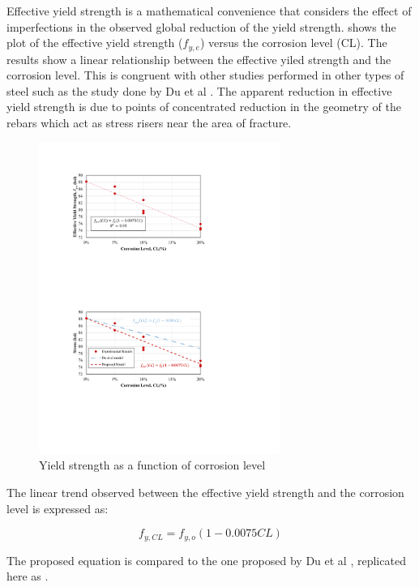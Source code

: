 Effective yield strength is a mathematical convenience that considers the effect of imperfections in the observed global reduction of the yield strength.  shows the plot of the effective yield strength ($f_{y,e}$) versus the corrosion level (CL). The results show a linear relationship between the effective yiled strength and the corrosion level. This is congruent with other studies performed in other types of steel such as the study done by Du et al \cite{Du2005}. The apparent reduction in effective yield strength is due to points of concentrated reduction in the geometry of the rebars which act as stress risers near the area of fracture. 
\begin{figure}[htbp]
	\centering
	\includegraphics[width=0.7\textwidth]{VAC Thesis 2.0/Chapter-4/figs/TensionTest_results_2.pdf}
	\caption{Yield strength as a function of corrosion level}
	\label{fig:YieldStrength_vs_CL}
\end{figure}

The linear trend observed between the effective yield strength and the corrosion level is expressed as:

\begin{equation}
    f_{y,CL} = f_{y,o}(1-0.0075CL)
    \label{eq.Calderon_Fy_vs_CL}
\end{equation}

The proposed equation is compared to the one proposed by Du et al \cite{Du2005}, replicated here as . 

